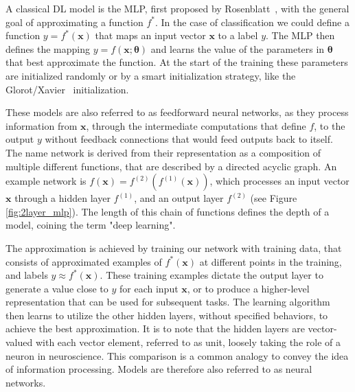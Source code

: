 A classical DL model is the \ac{MLP}, first proposed by Rosenblatt~\cite{rosenblatt1958perceptron}, with the general goal of approximating a function $f^*$. In the case of classification we could define a function $y = f^*(\mathbf{x})$ that maps an input vector $\mathbf{x}$ to a label $y$. The MLP then defines the mapping $y = f(\mathbf{x};\boldsymbol{\theta})$ and learns the value of the parameters in $\boldsymbol{\theta}$ that best approximate the function. At the start of the training these parameters are initialized randomly or by a smart initialization strategy, like the Glorot/Xavier~\cite{glorot2010understanding} initialization. \bigskip

These models are also referred to as feedforward neural networks, as they process information from $\mathbf{x}$, through the intermediate computations that define $f$, to the output $y$ without feedback connections that would feed outputs back to itself. The name network is derived from their representation as a composition of multiple different functions, that are described by a directed acyclic graph. An example network is $f(\mathbf{x}) = f^{(2)}(f^{(1)}(\mathbf{x}))$, which processes an input vector $\mathbf{x}$ through a hidden layer $f^{(1)}$, and an output layer $f^{(2)}$ (see Figure \ref{fig:2layer_mlp}).  The length of this chain of functions defines the depth of a model, coining the term "deep learning". 

The approximation is achieved by training our network with training data, that consists of approximated examples of $f^*(\mathbf{x})$ at different points in the training, and labels $y\approx f^*(\mathbf{x})$. These training examples dictate the output layer to generate a value close to $y$ for each input $\mathbf{x}$, or to produce a higher-level representation that can be used for subsequent tasks. The learning algorithm then learns to utilize the other hidden layers, without specified behaviors, to achieve the best approximation. It is to note that the hidden layers are vector-valued with each vector element, referred to as unit, loosely taking the role of a neuron in neuroscience. This comparison is a common analogy to convey the idea of information processing. Models are therefore also referred to as neural networks. \bigskip


